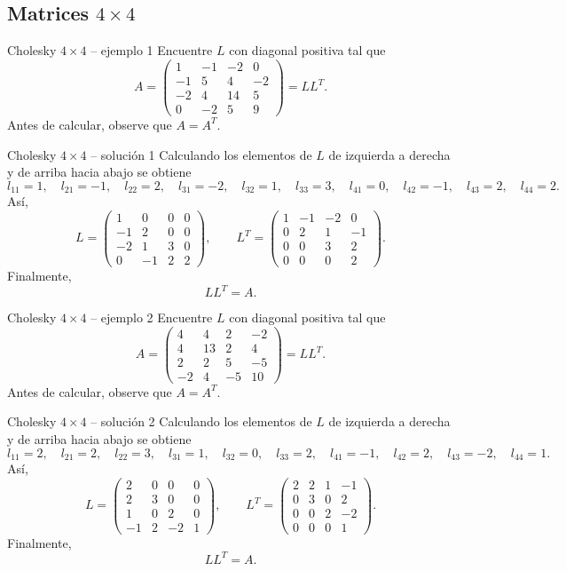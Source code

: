 \documentclass[aspectratio=169,10pt]{beamer}
\begin{document}
\subsection{Matrices $4\times 4$}
\begin{frame}{Cholesky $4\times 4$ -- ejemplo 1}
\small
Encuentre $L$ con diagonal positiva tal que
\[
A=\begin{pmatrix}1 & -1 & -2 & 0\\-1 & 5 & 4 & -2\\-2 & 4 & 14 & 5\\0 & -2 & 5 & 9\end{pmatrix}=LL^T.
\]
Antes de calcular, observe que $A=A^T$.
\end{frame}
\begin{frame}{Cholesky $4\times 4$ -- solución 1}
\small
Calculando los elementos de $L$ de izquierda a derecha y de arriba hacia abajo se obtiene
\[
l_{11}=1,\quad l_{21}=-1,\quad l_{22}=2,\quad l_{31}=-2,\quad l_{32}=1,\quad l_{33}=3,\quad l_{41}=0,\quad l_{42}=-1,\quad l_{43}=2,\quad l_{44}=2.
\]
Así,
\[
L=\begin{pmatrix}1 & 0 & 0 & 0\\-1 & 2 & 0 & 0\\-2 & 1 & 3 & 0\\0 & -1 & 2 & 2\end{pmatrix},\qquad L^T=\begin{pmatrix}1 & -1 & -2 & 0\\0 & 2 & 1 & -1\\0 & 0 & 3 & 2\\0 & 0 & 0 & 2\end{pmatrix}.
\]
Finalmente,
\[
\boxed{LL^T=A}.
\]
\end{frame}
\begin{frame}{Cholesky $4\times 4$ -- ejemplo 2}
\small
Encuentre $L$ con diagonal positiva tal que
\[
A=\begin{pmatrix}4 & 4 & 2 & -2\\4 & 13 & 2 & 4\\2 & 2 & 5 & -5\\-2 & 4 & -5 & 10\end{pmatrix}=LL^T.
\]
Antes de calcular, observe que $A=A^T$.
\end{frame}
\begin{frame}{Cholesky $4\times 4$ -- solución 2}
\small
Calculando los elementos de $L$ de izquierda a derecha y de arriba hacia abajo se obtiene
\[
l_{11}=2,\quad l_{21}=2,\quad l_{22}=3,\quad l_{31}=1,\quad l_{32}=0,\quad l_{33}=2,\quad l_{41}=-1,\quad l_{42}=2,\quad l_{43}=-2,\quad l_{44}=1.
\]
Así,
\[
L=\begin{pmatrix}2 & 0 & 0 & 0\\2 & 3 & 0 & 0\\1 & 0 & 2 & 0\\-1 & 2 & -2 & 1\end{pmatrix},\qquad L^T=\begin{pmatrix}2 & 2 & 1 & -1\\0 & 3 & 0 & 2\\0 & 0 & 2 & -2\\0 & 0 & 0 & 1\end{pmatrix}.
\]
Finalmente,
\[
\boxed{LL^T=A}.
\]
\end{frame}
\end{document}
